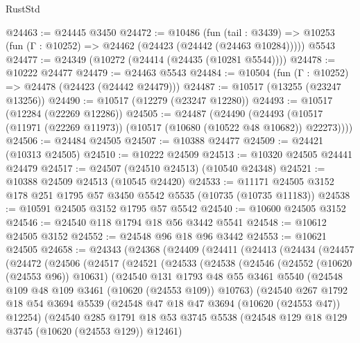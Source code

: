 \begin{lexlean}{RustStd}
\begin{coremodule}
@24463 := @24445 @3450
@24472 := @10486
    (fun (tail : @3439) => @10253 (fun (Γ : @10252) => @24462 (@24423 (@24442 (@24463 @10284)))))
    @5543
@24477 := @24349 (@10272 (@24414 (@24435 (@10281 @5544))))
@24478 := @10222 @24477
@24479 := @24463 @5543
@24484 := @10504 (fun (Γ : @10252) => @24478 (@24423 (@24442 @24479)))
@24487 := @10517 (@13255 (@23247 @13256))
@24490 := @10517 (@12279 (@23247 @12280))
@24493 := @10517 (@12284 (@22269 @12286))
@24505 := @24487
    (@24490 (@24493 (@10517 (@11971 (@22269 @11973)) (@10517 (@10680 (@10522 @48 @10682)) @22273))))
@24506 := @24484 @24505
@24507 := @10388 @24477
@24509 := @24421 (@10313 @24505)
@24510 := @10222 @24509
@24513 := @10320 @24505 @24441 @24479
@24517 := @24507 (@24510 @24513) (@10540 @24348)
@24521 := @10388 @24509 @24513 (@10545 @24420)
@24533 := @11171 @24505 @3152 @178 @251 @1795 @57 @3450 @5542 @5535 (@10735 (@10735 @11183))
@24538 := @10591 @24505 @3152 @1795 @57 @5542
@24540 := @10600 @24505 @3152
@24546 := @24540 @118 @1794 @18 @56 @3442 @5541
@24548 := @10612 @24505 @3152
@24552 := @24548 @96 @18 @96 @3442
@24553 := @10621 @24505
@24658 := @24343
    (@24368
      (@24409
        (@24411
          (@24413
            (@24434
              (@24457
                (@24472
                  (@24506
                    (@24517
                      (@24521
                        (@24533
                          (@24538
                            (@24546
                              (@24552 (@10620 (@24553 @96)) @10631)
                              (@24540
                                @131
                                @1793
                                @48
                                @55
                                @3461
                                @5540
                                (@24548 @109 @48 @109 @3461 (@10620 (@24553 @109)) @10763)
                                (@24540
                                  @267
                                  @1792
                                  @18
                                  @54
                                  @3694
                                  @5539
                                  (@24548 @47 @18 @47 @3694 (@10620 (@24553 @47)) @12254)
                                  (@24540
                                    @285
                                    @1791
                                    @18
                                    @53
                                    @3745
                                    @5538
                                    (@24548 @129 @18 @129 @3745 (@10620 (@24553 @129)) @12461)

\end{coremodule}
\end{lexlean}
